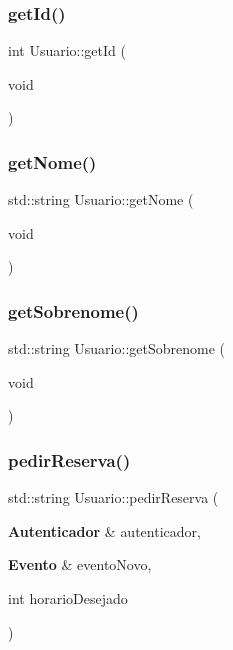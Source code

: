 \mbox{\label{class_usuario_a71fe841133c88c6f2c71a5225fd1cd5c}} 
\subsubsection{get\+Id()}
{\footnotesize\ttfamily int Usuario\+::get\+Id (\begin{DoxyParamCaption}\item[{void}]{ }\end{DoxyParamCaption})\hspace{0.3cm}{\ttfamily [inline]}}

\mbox{\label{class_usuario_a95cd963206ebacf43b033af966ef9a87}} 
\subsubsection{get\+Nome()}
{\footnotesize\ttfamily std\+::string Usuario\+::get\+Nome (\begin{DoxyParamCaption}\item[{void}]{ }\end{DoxyParamCaption})\hspace{0.3cm}{\ttfamily [inline]}}

\mbox{\label{class_usuario_ae8583289766b839e0357790d7d7f0353}} 
\subsubsection{get\+Sobrenome()}
{\footnotesize\ttfamily std\+::string Usuario\+::get\+Sobrenome (\begin{DoxyParamCaption}\item[{void}]{ }\end{DoxyParamCaption})\hspace{0.3cm}{\ttfamily [inline]}}

\mbox{\label{class_usuario_a0f737dc773adbfccd60665f7a3a053d6}} 
\subsubsection{pedir\+Reserva()}
{\footnotesize\ttfamily std\+::string Usuario\+::pedir\+Reserva (\begin{DoxyParamCaption}\item[{\textbf{ Autenticador} \&}]{autenticador,  }\item[{\textbf{ Evento} \&}]{evento\+Novo,  }\item[{int}]{horario\+Desejado }\end{DoxyParamCaption})\hspace{0.3cm}{\ttfamily [inline]}}



